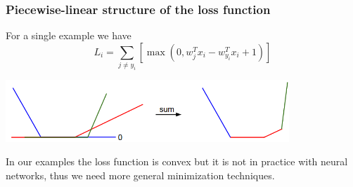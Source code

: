 \documentclass{beamer}
\begin{document}
\begin{frame}
\begin{figure}
\begin{subfigure}{.33\textwidth}
    \end{subfigure}%
    \begin{subfigure}{.33\textwidth}
      \centering
    \end{subfigure}%
  \end{figure}
\end{frame}

\begin{frame}
  \frametitle{Piecewise-linear structure of the loss function}
  For a single example we have
  \[L_i = \sum_{j\neq y_i} \left[ \max(0, w_j^Tx_i - w_{y_i}^Tx_i + 1) \right]\]
  \begin{center}
    \includegraphics[width=0.8\textwidth]{svmbowl}
  \end{center}
  \vfill{}
  In our examples the loss function is convex but it is not in practice with neural networks, thus we need more general minimization techniques.
\end{frame}
\end{document}
